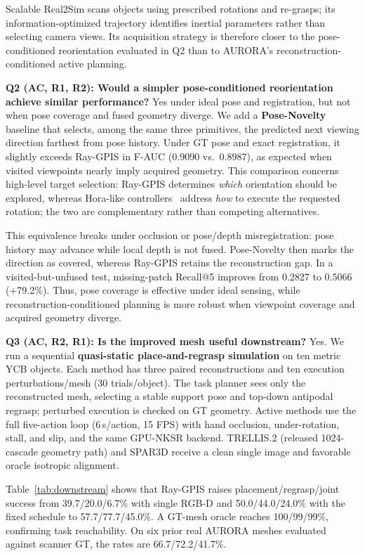 \documentclass[conference]{IEEEtran}
\begin{document}
Scalable Real2Sim scans objects using prescribed rotations and re-grasps; its
information-optimized trajectory identifies inertial parameters rather than
selecting camera views. Its acquisition strategy is therefore closer to the
pose-conditioned reorientation evaluated in Q2 than to AURORA's
reconstruction-conditioned active planning.

\textbf{Q2 (AC, R1, R2): Would a simpler pose-conditioned reorientation
achieve similar performance?} Yes under ideal pose and registration, but not
when pose coverage and fused geometry diverge. We add a \textbf{Pose-Novelty} baseline that
selects, among the same three primitives, the predicted next viewing direction
farthest from pose history. Under GT pose and exact registration, it slightly
exceeds Ray-GPIS in F-AUC (0.9090 vs.\ 0.8987), as expected when visited
viewpoints nearly imply acquired geometry. This comparison concerns high-level
target selection: Ray-GPIS determines \emph{which} orientation should be
explored, whereas Hora-like controllers~\cite{hora} address \emph{how} to
execute the requested rotation; the two are complementary rather than
competing alternatives.

This equivalence breaks under occlusion or pose/depth misregistration: pose
history may advance while local depth is not fused. Pose-Novelty then marks the
direction as covered, whereas Ray-GPIS retains the reconstruction gap. In a
visited-but-unfused test, missing-patch Recall@5 improves from 0.2827 to 0.5066
(+79.2\%). Thus, pose coverage is effective under ideal sensing, while
reconstruction-conditioned planning is more robust when viewpoint coverage
and acquired geometry diverge.


\textbf{Q3 (AC, R2, R1): Is the improved mesh useful downstream?}
Yes. We run a sequential \textbf{quasi-static place-and-regrasp simulation} on ten metric
YCB objects. Each method has three paired reconstructions and ten execution
perturbations/mesh (30 trials/object). The task planner sees only the
reconstructed mesh, selecting a stable support pose and top-down antipodal
regrasp; perturbed execution is checked on GT geometry. Active methods use the
full five-action loop (6\,s/action, 15 FPS) with hand occlusion,
under-rotation, stall, and slip, and the same GPU-NKSR backend. TRELLIS.2
(released 1024-cascade geometry path) and SPAR3D receive a clean single image
and favorable oracle isotropic alignment.

Table~\ref{tab:downstream} shows that Ray-GPIS raises
placement/regrasp/joint success from 39.7/20.0/6.7\% with single RGB-D and
50.0/44.0/24.0\% with the fixed schedule to 57.7/77.7/45.0\%. A GT-mesh
oracle reaches 100/99/99\%, confirming task reachability. On six prior real
AURORA meshes evaluated against scanner GT, the rates are 66.7/72.2/41.7\%.
\end{document}
